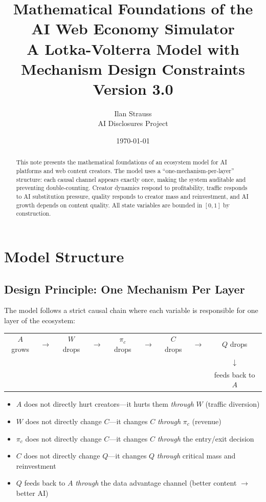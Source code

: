 \documentclass[11pt,a4paper]{article}
\title{Mathematical Foundations of the AI Web Economy Simulator\\[0.5em]\large A Lotka-Volterra Model with Mechanism Design Constraints\\[0.3em]\normalsize Version 3.0}
\author{Ilan Strauss\\[0.5em]\small AI Disclosures Project}
\date{\today}
\begin{document}
\maketitle

\begin{abstract}
This note presents the mathematical foundations of an ecosystem model for AI platforms and web content creators. The model uses a ``one-mechanism-per-layer'' structure: each causal channel appears exactly once, making the system auditable and preventing double-counting. Creator dynamics respond to profitability, traffic responds to AI substitution pressure, quality responds to creator mass and reinvestment, and AI growth depends on content quality. All state variables are bounded in $[0,1]$ by construction.
\end{abstract}

\section{Model Structure}

\subsection{Design Principle: One Mechanism Per Layer}

The model follows a strict causal chain where each variable is responsible for one layer of the ecosystem:

\begin{center}
\begin{tabular}{ccccccccc}
$A$ grows & $\rightarrow$ & $W$ drops & $\rightarrow$ & $\pi_c$ drops & $\rightarrow$ & $C$ drops & $\rightarrow$ & $Q$ drops \\
& & & & & & & & $\downarrow$ \\
& & & & & & & & feeds back to $A$
\end{tabular}
\end{center}

\begin{itemize}
    \item $A$ does not directly hurt creators---it hurts them \textit{through} $W$ (traffic diversion)
    \item $W$ does not directly change $C$---it changes $C$ \textit{through} $\pi_c$ (revenue)
    \item $\pi_c$ does not directly change $C$---it changes $C$ \textit{through} the entry/exit decision
    \item $C$ does not directly change $Q$---it changes $Q$ \textit{through} critical mass and reinvestment
    \item $Q$ feeds back to $A$ \textit{through} the data advantage channel (better content $\rightarrow$ better AI)
\end{itemize}
\end{document}
